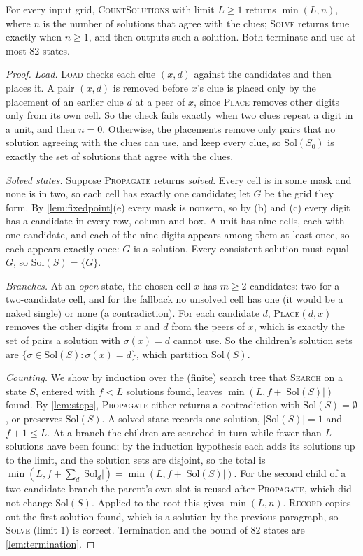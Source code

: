 \begin{theorem}[correctness]
\label{thm:correct}
For every input grid, \textsc{CountSolutions} with limit $L\ge 1$ returns $\min(L, n)$, where $n$ is the number of
solutions that agree with the clues; \textsc{Solve} returns true exactly when $n\ge 1$, and then outputs such a
solution. Both terminate and use at most 82 states.
\end{theorem}
\begin{proof}
\emph{Load.} \textsc{Load} checks each clue $(x,d)$ against the candidates and then places it. A pair $(x,d)$ is removed
before $x$'s clue is placed only by the placement of an earlier clue $d$ at a peer of $x$, since \textsc{Place} removes
other digits only from its own cell. So the check fails exactly when two clues repeat a digit in a unit, and then
$n=0$. Otherwise, the placements remove only pairs that no solution agreeing with the clues can use, and keep every
clue, so $\mathrm{Sol}(S_0)$ is exactly the set of solutions that agree with the clues.

\emph{Solved states.} Suppose \textsc{Propagate} returns \emph{solved}. Every cell is in some mask and none is in two,
so each cell has exactly one candidate; let $G$ be the grid they form. By \cref{lem:fixedpoint}(e) every mask is nonzero, so by (b) and (c) every
digit has a candidate in every row, column and box. A unit has nine cells, each with one candidate, and each of the nine
digits appears among them at least once, so each appears exactly once: $G$ is a solution. Every consistent solution
must equal $G$, so $\mathrm{Sol}(S)=\{G\}$.

\emph{Branches.} At an \emph{open} state, the chosen cell $x$ has $m\ge 2$ candidates: two for a two-candidate cell, and
for the fallback no unsolved cell has one (it would be a naked single) or none (a contradiction). For each candidate
$d$, \textsc{Place}$(d, x)$ removes the other digits from $x$ and $d$ from the peers of $x$, which is exactly the set of
pairs a solution with $\sigma(x)=d$ cannot use. So the children's solution sets are $\{\sigma\in\mathrm{Sol}(S):
\sigma(x)=d\}$, which partition $\mathrm{Sol}(S)$.

\emph{Counting.} We show by induction over the (finite) search tree that \textsc{Search} on a state $S$, entered with
$f<L$ solutions found, leaves $\min(L, f+|\mathrm{Sol}(S)|)$ found. By \cref{lem:steps}, \textsc{Propagate} either
returns a contradiction with $\mathrm{Sol}(S)=\emptyset$, or preserves $\mathrm{Sol}(S)$. A solved state records one
solution, $|\mathrm{Sol}(S)|=1$ and $f+1\le L$. At a branch the children are searched in turn while fewer than $L$
solutions have been found; by the induction hypothesis each adds its solutions up to the limit, and the solution sets
are disjoint, so the total is $\min(L, f+\sum_d|\mathrm{Sol}_d|)=\min(L, f+|\mathrm{Sol}(S)|)$. For the second child of a
two-candidate branch the parent's own slot is reused after \textsc{Propagate}, which did not change
$\mathrm{Sol}(S)$. Applied to the root this gives $\min(L,n)$. \textsc{Record} copies out the first solution found,
which is a solution by the previous paragraph, so \textsc{Solve} (limit 1) is correct. Termination and the bound of 82
states are \cref{lem:termination}.
\end{proof}

